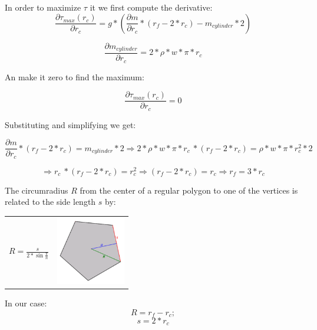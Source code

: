 In order to maximize $\tau$ it we first compute the derivative:
\[\frac{\partial \tau _{max} (r_c)}{\partial r_c} = g *(\frac{\partial m}{\partial r_c} * (r_f - 2 * r_c) -  m_{cylinder} * 2)\]

\[ \frac{\partial  m_{cylinder}}{\partial r_c} = 2 * \rho * w * \pi *  r_c\]

An make it zero to find the maximum:

\[\frac{\partial \tau _{max} (r_c)}{\partial r_c} = 0\]

Substituting and simplifying we get:

\[\frac{\partial m}{\partial r_c} * (r_f - 2 * r_c) =   m_{cylinder} * 2 \Rightarrow 2 * \rho * w * \pi *  r_c\ * (r_f - 2 * r_c) = \rho * w * \pi * r_c^2 * 2 \]

\[ \Rightarrow r_c\ * (r_f - 2 * r_c) =  r_c^2 \Rightarrow (r_f - 2 * r_c) =  r_c \Rightarrow \boxed{r_f = 3 * r_c}\]


The circumradius $R$ from the center of a regular polygon to one of the vertices is related to the side length $s$ by:

\begin{center}
	\begin{tabular}{ c  c }
		\(\displaystyle R=\frac {s}{2* \sin{\frac {\pi} {n}}} \)
		& 
		\includegraphics[width=3cm]{img/PolygonParameters.png}
	\end{tabular}
\end{center}

In our case:
\[ R = r_f - r_c; \]
\[ s = 2 * r_c\]

